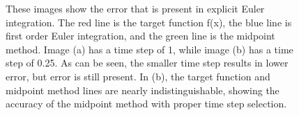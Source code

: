 \documentclass{thesis}
\begin{document}
\begin{figure}
\centering
{}
\caption[Euler integration]{These images show the error that is present in explicit Euler integration.  The red line is the target
function f(x), the blue line is first order Euler integration, and the green line is the midpoint method.  Image (a) has a time step of 1,
while image (b) has a time step of 0.25.  As can be seen, the smaller time step results in lower error, but error is still present.
In (b), the target function and midpoint method lines are nearly indistinguishable, showing the accuracy of the midpoint method with
proper time step selection.}
\label{fig:euler_integration}
\end{figure}
\end{document}
